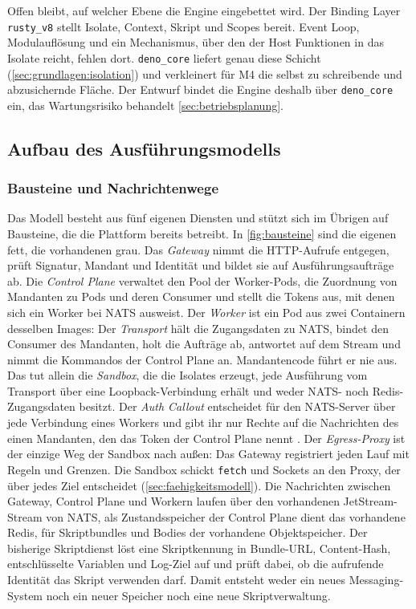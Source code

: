 Offen bleibt, auf welcher Ebene die Engine eingebettet wird. Der Binding Layer \texttt{rusty\_v8} stellt Isolate,
Context, Skript und Scopes bereit. Event Loop, Modulauflösung und ein Mechanismus, über den der Host Funktionen in das
Isolate reicht, fehlen dort. \texttt{deno\_core} liefert genau diese Schicht
(\autoref{sec:grundlagen:isolation}) und verkleinert für M4 die selbst zu schreibende und abzusichernde Fläche. Der
Entwurf bindet die Engine deshalb über \texttt{deno\_core} ein, das Wartungsrisiko behandelt
\autoref{sec:betriebsplanung}.

\subsection{Aufbau des Ausführungsmodells}
\label{sec:orchestrierung}

\subsubsection{Bausteine und Nachrichtenwege}
\label{sec:bausteine}

Das Modell besteht aus fünf eigenen Diensten und stützt sich im Übrigen auf Bausteine, die die Plattform bereits
betreibt. In \autoref{fig:bausteine} sind die eigenen fett, die vorhandenen grau. Das \emph{Gateway} nimmt die \ac{HTTP}-Aufrufe entgegen, prüft Signatur, Mandant und Identität und bildet
sie auf Ausführungsaufträge ab. Die \emph{Control Plane} verwaltet den Pool der Worker-Pods, die Zuordnung von
Mandanten zu Pods und deren Consumer und stellt die Tokens aus, mit denen sich ein Worker bei NATS ausweist. Der
\emph{Worker} ist ein Pod aus zwei Containern desselben Images: Der \emph{Transport} hält die Zugangsdaten zu NATS,
bindet den Consumer des Mandanten, holt die Aufträge ab, antwortet auf dem Stream und nimmt die Kommandos der Control
Plane an. Mandantencode führt er nie aus. Das tut allein die \emph{Sandbox}, die die Isolates erzeugt, jede
Ausführung vom Transport über eine Loopback-Verbindung erhält und weder NATS- noch Redis-Zugangsdaten besitzt. Der
\emph{Auth Callout} entscheidet für den NATS-Server über jede Verbindung eines Workers und gibt ihr nur Rechte auf die
Nachrichten des einen Mandanten, den das Token der Control Plane nennt
\autocite{the_nats_authors_auth_callout_2026}. Der \emph{Egress-Proxy} ist der einzige Weg der Sandbox nach außen: Das Gateway
registriert jeden Lauf mit Regeln und Grenzen. Die Sandbox schickt \texttt{fetch} und Sockets an den Proxy, der über
jedes Ziel entscheidet (\autoref{sec:faehigkeitsmodell}). Die Nachrichten zwischen Gateway, Control Plane und Workern laufen über
den vorhandenen JetStream-Stream von NATS, als Zustandsspeicher der Control Plane dient das vorhandene Redis, für
Skriptbundles und Bodies der vorhandene Objektspeicher. Der bisherige Skriptdienst löst eine Skriptkennung in
Bundle-\ac{URL}, Content-Hash, entschlüsselte Variablen und Log-Ziel auf und prüft dabei, ob die aufrufende Identität
das Skript verwenden darf. Damit entsteht weder ein neues Messaging-System noch ein neuer Speicher noch eine neue
Skriptverwaltung.

